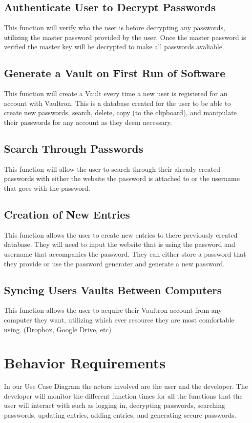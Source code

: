 \documentclass[11pt]{report}
\begin{document}
\subsection{Authenticate User to Decrypt Passwords}
This function will verify who the user is before decrypting any passwords, utilizing 
the master password provided by the user. Once the master password is verified
the master key will be decrypted to make all passwords avaliable.

\subsection{Generate a Vault on First Run of Software}
This function will create a Vault every time a new user is registered for an account 
with Vaultron. This is a database created for the user to be able to create new
passwords, search, delete, copy (to the clipboard), and manipulate their passwords
for any account as they deem necessary.

\subsection{Search Through Passwords}
This function will allow the user to search through their already created passwords
with either the website the password is attached to or the username that goes with 
the password. 

\subsection{Creation of New Entries}
This function allows the user to create new entries to there previously created 
database. They will need to input the website that is using the password and
username that accompanies the password.  They can either store a password that
they provide or use the password generater and generate a new password.

\subsection{Syncing Users Vaults Between Computers}
This function allows the user to acquire their Vaultron account from any computer 
they want, utilizing which ever resource they are most comfortable using. (Dropbox, 
Google Drive, etc)

\section{Behavior Requirements}
In our Use Case Diagram the actors involved are the user and the developer. The developer will monitor the 
different function times for all the functions that the user will interact with such as logging in, decrypting
passwords, searching passwords, updating entries, adding entries, and generating secure passwords. 
\end{document}
